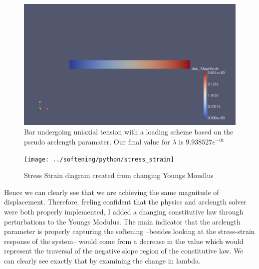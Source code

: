\documentclass[10pt,a4paper]{article}
\begin{document}
\begin{figure}[h!]
	\centering
	\includegraphics[width=0.7\linewidth]{2d_lam}
	\caption{Bar undergoing uniaxial tension with a loading scheme based on the pseudo arclength paramater. Our final value for $\lambda$ is $9.938527e^{-01} $}
	\label{fig:2dlam}
\end{figure}

\begin{figure}[h!]
	\centering
	\texttt{[image: ../softening/python/stress\_strain]}
	\caption{Stress Strain diagram created from changing Youngs Moudlus}
	\label{fig:stressstrain}
\end{figure}

	Hence we can clearly see that we are achieving the same magnitude of displacement. Therefore, feeling confident that the physics and arclength solver were both properly implemented, I added a changing constitutive law through perturbations to the Youngs Modulus. 
	The main indicator that the arclength parameter is properly capturing the softening --besides looking at the stress-strain response of the system-- would come from a decrease in the value which would represent the traversal of the negative slope region of the constitutive law. We can clearly see exactly that by examining the change in lambda.
	
\end{document}
